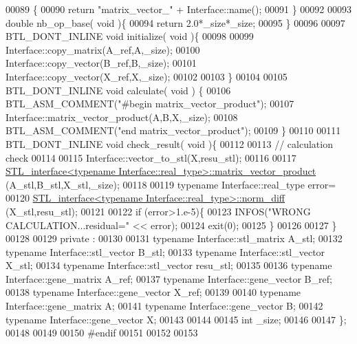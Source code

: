 \begin{DoxyCode}
00089   \{
00090     \textcolor{keywordflow}{return} \textcolor{stringliteral}{"matrix\_vector\_"} + Interface::name();
00091   \}
00092 
00093   \textcolor{keywordtype}{double} nb\_op\_base( \textcolor{keywordtype}{void} )\{
00094     \textcolor{keywordflow}{return} 2.0*\_size*\_size;
00095   \}
00096 
00097   BTL\_DONT\_INLINE  \textcolor{keywordtype}{void} initialize( \textcolor{keywordtype}{void} )\{
00098 
00099     Interface::copy\_matrix(A\_ref,A,\_size);
00100     Interface::copy\_vector(B\_ref,B,\_size);
00101     Interface::copy\_vector(X\_ref,X,\_size);
00102 
00103   \}
00104 
00105   BTL\_DONT\_INLINE \textcolor{keywordtype}{void} calculate( \textcolor{keywordtype}{void} ) \{
00106       BTL\_ASM\_COMMENT(\textcolor{stringliteral}{"#begin matrix\_vector\_product"});
00107       Interface::matrix\_vector\_product(A,B,X,\_size);
00108       BTL\_ASM\_COMMENT(\textcolor{stringliteral}{"end matrix\_vector\_product"});
00109   \}
00110 
00111   BTL\_DONT\_INLINE \textcolor{keywordtype}{void} check\_result( \textcolor{keywordtype}{void} )\{
00112 
00113     \textcolor{comment}{// calculation check}
00114 
00115     Interface::vector\_to\_stl(X,resu\_stl);
00116 
00117     \hyperlink{class_s_t_l__interface}{STL\_interface<typename Interface::real\_type>::matrix\_vector\_product}
      (A\_stl,B\_stl,X\_stl,\_size);
00118 
00119     \textcolor{keyword}{typename} Interface::real\_type error=
00120       \hyperlink{class_s_t_l__interface}{STL\_interface<typename Interface::real\_type>::norm\_diff}
      (X\_stl,resu\_stl);
00121 
00122     \textcolor{keywordflow}{if} (error>1.e-5)\{
00123       INFOS(\textcolor{stringliteral}{"WRONG CALCULATION...residual="} << error);
00124       exit(0);
00125     \}
00126 
00127   \}
00128 
00129 private :
00130 
00131   \textcolor{keyword}{typename} Interface::stl\_matrix A\_stl;
00132   \textcolor{keyword}{typename} Interface::stl\_vector B\_stl;
00133   \textcolor{keyword}{typename} Interface::stl\_vector X\_stl;
00134   \textcolor{keyword}{typename} Interface::stl\_vector resu\_stl;
00135 
00136   \textcolor{keyword}{typename} Interface::gene\_matrix A\_ref;
00137   \textcolor{keyword}{typename} Interface::gene\_vector B\_ref;
00138   \textcolor{keyword}{typename} Interface::gene\_vector X\_ref;
00139 
00140   \textcolor{keyword}{typename} Interface::gene\_matrix A;
00141   \textcolor{keyword}{typename} Interface::gene\_vector B;
00142   \textcolor{keyword}{typename} Interface::gene\_vector X;
00143 
00144 
00145   \textcolor{keywordtype}{int} \_size;
00146 
00147 \};
00148 
00149 
00150 \textcolor{preprocessor}{#endif}
00151 
00152 
00153 
\end{DoxyCode}
